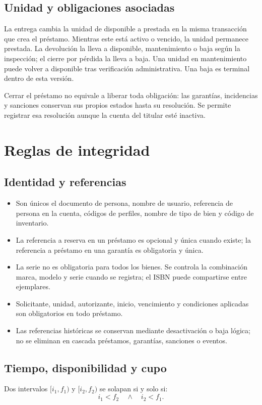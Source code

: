 \subsection{Unidad y obligaciones asociadas}
La entrega cambia la unidad de disponible a prestada en la misma transacci\'on que crea el pr\'estamo. Mientras este est\'a activo o vencido, la unidad permanece prestada. La devoluci\'on la lleva a disponible, mantenimiento o baja seg\'un la inspecci\'on; el cierre por p\'erdida la lleva a baja. Una unidad en mantenimiento puede volver a disponible tras verificaci\'on administrativa. Una baja es terminal dentro de esta versi\'on.

Cerrar el pr\'estamo no equivale a liberar toda obligaci\'on: las garant\'ias, incidencias y sanciones conservan sus propios estados hasta su resoluci\'on. Se permite registrar esa resoluci\'on aunque la cuenta del titular est\'e inactiva.

\section{Reglas de integridad}
\label{sec:integridad}

\subsection{Identidad y referencias}
\begin{itemize}
    \item Son \'unicos el documento de persona, nombre de usuario, referencia de persona en la cuenta, c\'odigos de perfiles, nombre de tipo de bien y c\'odigo de inventario.
    \item La referencia a reserva en un pr\'estamo es opcional y \'unica cuando existe; la referencia a pr\'estamo en una garant\'ia es obligatoria y \'unica.
    \item La serie no es obligatoria para todos los bienes. Se controla la combinaci\'on marca, modelo y serie cuando se registra; el ISBN puede compartirse entre ejemplares.
    \item Solicitante, unidad, autorizante, inicio, vencimiento y condiciones aplicadas son obligatorios en todo pr\'estamo.
    \item Las referencias hist\'oricas se conservan mediante desactivaci\'on o baja l\'ogica; no se eliminan en cascada pr\'estamos, garant\'ias, sanciones o eventos.
\end{itemize}

\subsection{Tiempo, disponibilidad y cupo}
Dos intervalos $[i_1,f_1)$ y $[i_2,f_2)$ se solapan si y solo si:
\[
    i_1 < f_2 \quad \land \quad i_2 < f_1.
\]

